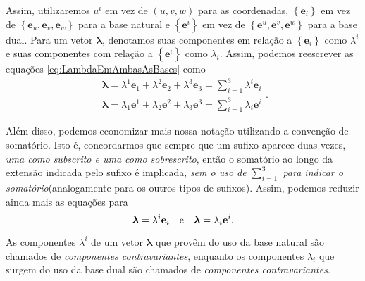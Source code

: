 Assim, utilizaremos $u^i$ em vez de $(u,v,w)$ para as coordenadas, $\left\{\mathbf{e}_{i}\right\}$ em vez de $\left\{\mathbf{e}_{u}, \mathbf{e}_{v}, \mathbf{e}_{w}\right\}$ para a base natural e $\left\{\mathbf{e}^{i}\right\}$ em vez de $\left\{\mathbf{e}^{u}, \mathbf{e}^{v}, \mathbf{e}^{w}\right\}$ para a base dual. Para um vetor $\boldsymbol{\lambda}$, denotamos suas componentes em relação a $\left\{\mathbf{e}_{i}\right\}$ como $\lambda^i$ e suas componentes com relação a $\left\{\mathbf{e}^{i}\right\}$ como $\lambda_i$.
Assim, podemos reescrever as equações \eqref{eq:LambdaEmAmbasAsBases} como 
\[
\begin{array}{l}{\boldsymbol{\lambda}=\lambda^{1} \mathbf{e}_{1}+\lambda^{2} \mathbf{e}_{2}+\lambda^{3} \mathbf{e}_{3}=\displaystyle\sum_{i=1}^{3} \lambda^{i} \mathbf{e}_{i}} \\ {\boldsymbol{\lambda}=\lambda_{1} \mathbf{e}^{1}+\lambda_{2} \mathbf{e}^{2}+\lambda_{3} \mathbf{e}^{3}=\displaystyle\sum_{i=1}^{3} \lambda_{i} \mathbf{e}^{i}}\end{array} .
\]

Além disso, podemos economizar mais nossa notação utilizando a convenção de somatório. Isto é, concordarmos que sempre que um sufixo aparece duas vezes, \textit{uma como subscrito e uma como sobrescrito}, então o somatório ao longo da extensão indicada pelo sufixo é implicada, \textit{sem o uso de $\sum_{i=1}^3$ para indicar o somatório}(analogamente para os outros tipos de sufixos). Assim, podemos reduzir ainda mais as equações para
\begin{equation}\label{eq:LambdaEmAmbasAsBasesConvencaoSomatorio}
	\boldsymbol{\lambda}=\lambda^{i} \mathbf{e}_{i} \qq{e} \boldsymbol{\lambda}=\lambda_{i} \mathbf{e}^{i} .
\end{equation}

As componentes $\lambda^i$ de um vetor $\boldsymbol{\lambda}$ que provêm do uso da base natural são chamados de \textit{componentes contravariantes}, enquanto os componentes $\lambda_i$ que surgem do uso da base dual são chamados de \textit{componentes contravariantes}.


